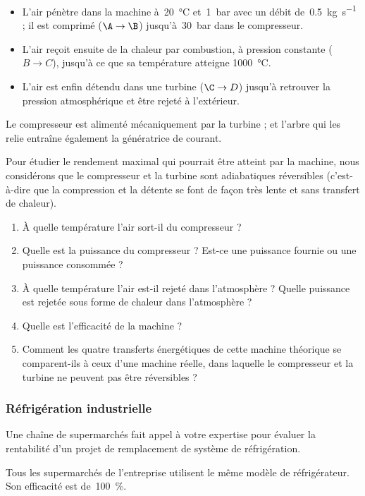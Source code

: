 	\begin{itemize}
		\item L’air pénètre dans la machine à~\SI{20}{\degreeCelsius} et~\SI{1}{\bar} avec un débit de~\SI{0,5}{\kilogram\per\second} ; il est comprimé ($\A \to \B$) jusqu’à~\SI{30}{\bar} dans le compresseur.	
		\item L’air reçoit ensuite de la chaleur par combustion, à pression constante ($B \to C$), jusqu’à ce que sa température atteigne \SI{1000}{\degreeCelsius}.	
		\item L’air est enfin détendu dans une turbine ($\C \to D$) jusqu’à retrouver la pression atmosphérique et être rejeté à l’extérieur.
	\end{itemize}
	
	Le compresseur est alimenté mécaniquement par la turbine ; et l’arbre qui les relie entraîne également la génératrice de courant.
	
	Pour étudier le rendement maximal qui pourrait être atteint par la machine, nous considérons que le compresseur et la turbine sont adiabatiques réversibles (c’est-à-dire que la compression et la détente se font de façon très lente et sans transfert de chaleur).

	\begin{enumerate}
		\item À quelle température l’air sort-il du compresseur ?
		\item Quelle est la puissance du compresseur ? Est-ce une puissance fournie ou une puissance consommée ?
		\item À quelle température l’air est-il rejeté dans l’atmosphère ? Quelle puissance est rejetée sous forme de chaleur dans l’atmosphère ?
		\item Quelle est l’efficacité de la machine ?
		\item Comment les quatre transferts énergétiques de cette machine théorique se comparent-ils à ceux d’une machine réelle, dans laquelle le compresseur et la turbine ne peuvent pas être réversibles ?
	\end{enumerate}
	

\subsubsection{Réfrigération industrielle}

	Une chaîne de supermarchés fait appel à votre expertise pour évaluer la rentabilité d’un projet de remplacement de système de réfrigération. 
	
	Tous les supermarchés de l’entreprise utilisent le même modèle de réfrigérateur. Son efficacité est de~\SI{100}{\percent}.
	
